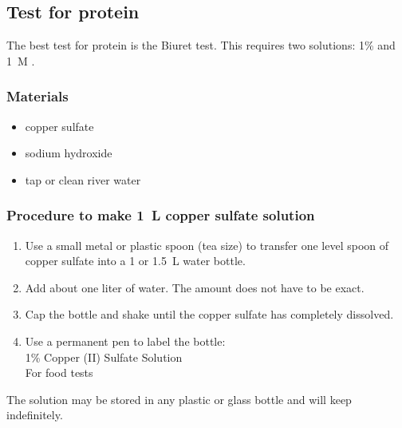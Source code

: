 \subsection{Test for protein}

The best test for protein is the Biuret test. This requires two solutions: 1\%  and 1~M .

\subsubsection{Materials}
\begin{itemize}
\item{copper sulfate}
\item{sodium hydroxide}
\item{tap or clean river water}
\end{itemize}

\subsubsection{Procedure to make 1~L copper sulfate solution}
\begin{enumerate}
\item{Use a small metal or plastic spoon (tea size) to transfer one level spoon of copper sulfate into a 1 or 1.5~L water bottle.}
\item{Add about one liter of water. The amount does not have to be exact.}
\item{Cap the bottle and shake until the copper sulfate has completely dissolved.}
\item{Use a permanent pen to label the bottle:\\
1\% Copper (II) Sulfate Solution\\
For food tests}
\end{enumerate}

The solution may be stored in any plastic or glass bottle and will keep indefinitely.

